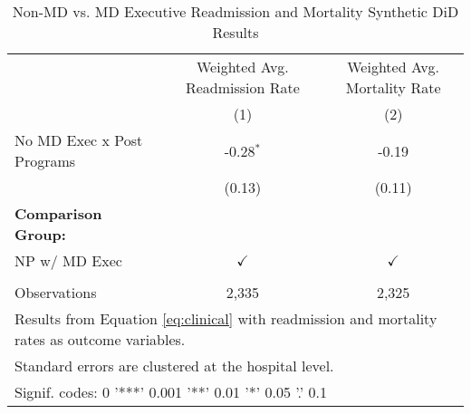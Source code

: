 \begin{table}[ht!]

\caption{\label{tab:MD_noMD_readmort_synth}Non-MD vs. MD Executive Readmission and Mortality Synthetic DiD Results}
\centering
\begin{tabular}[t]{lcc}
\toprule
\multicolumn{1}{c}{ } & \multicolumn{1}{c}{Weighted Avg. Readmission Rate} & \multicolumn{1}{c}{Weighted Avg. Mortality Rate} \\
 & (1) & (2)\\
\midrule
No MD Exec x Post Programs & -0.28$^{*}$ & -0.19\\
 & (0.13) & (0.11)\\
\textbf{Comparison Group:} &  & \\
NP w/ MD Exec & $\checkmark$ & $\checkmark$\\
 &  & \\
\addlinespace
Observations & 2,335 & 2,325\\
\bottomrule
\multicolumn{3}{l}{\textsuperscript{} Results from Equation \ref{eq:clinical} with readmission and mortality rates as outcome variables.}\\
\multicolumn{3}{l}{\textsuperscript{} Standard errors are clustered at the hospital level.}\\
\multicolumn{3}{l}{\textsuperscript{} Signif. codes: 0 '***' 0.001 '**' 0.01 '*' 0.05 '.' 0.1}\\
\end{tabular}
\end{table}
